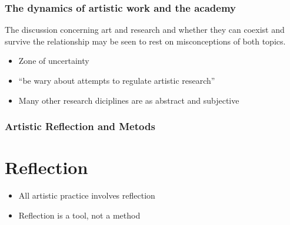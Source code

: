 \documentclass[ignorenonframetext]{beamer}
\begin{document}
\begin{frame}
  \frametitle{The dynamics of artistic work and the academy}
  
The discussion concerning art and research and whether they can coexist and survive the relationship may be seen to rest on misconceptions of both topics. 

\begin{itemize}
\item<1-> Zone of uncertainty
\item<2-> ``be wary about attempts to regulate artistic research''
\item<3-> Many other research diciplines are as abstract and subjective
\end{itemize}

\end{frame}

\begin{frame}
  \frametitle{Artistic Reflection and Metods}
  
  \section{Reflection}
  \begin{itemize}
  \item<1-> All artistic practice involves reflection
  \item<2-> Reflection is a tool, not a method

  \end{itemize}
  

\end{frame}
\end{document}
